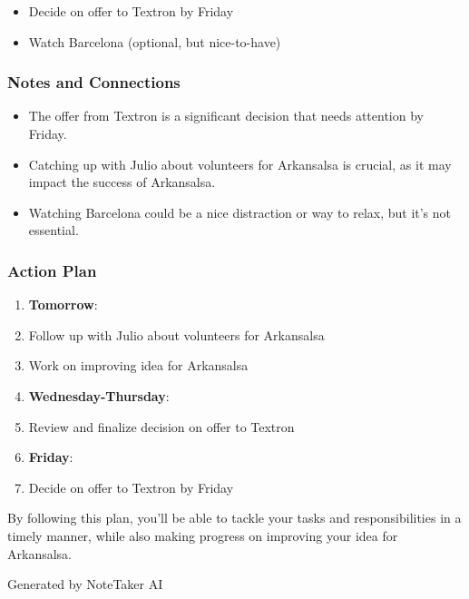 \documentclass[11pt,a4paper]{article}
\begin{document}
\begin{itemize}
  \item Decide on offer to Textron by Friday
  \item Watch Barcelona (optional, but nice-to-have)
\end{itemize}

\subsubsection*{Notes and Connections}

\begin{itemize}
  \item The offer from Textron is a significant decision that needs attention by Friday.
  \item Catching up with Julio about volunteers for Arkansalsa is crucial, as it may impact the success of Arkansalsa.
  \item Watching Barcelona could be a nice distraction or way to relax, but it's not essential.
\end{itemize}

\subsubsection*{Action Plan}

\begin{enumerate}
  \item \textbf{Tomorrow}:
  \item Follow up with Julio about volunteers for Arkansalsa
  \item Work on improving idea for Arkansalsa
  \item \textbf{Wednesday-Thursday}:
  \item Review and finalize decision on offer to Textron
  \item \textbf{Friday}:
  \item Decide on offer to Textron by Friday
\end{enumerate}

By following this plan, you'll be able to tackle your tasks and responsibilities in a timely manner, while also making progress on improving your idea for Arkansalsa.

\vspace{1cm}

\begin{center}
\textcolor{secondarycolor}{\small Generated by NoteTaker AI}
\end{center}
\end{document}
